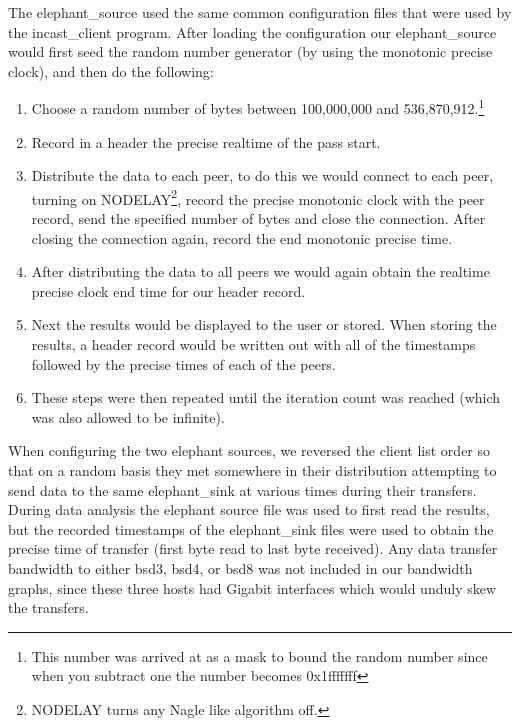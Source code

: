 \documentclass[12pt]{article}
\begin{document}
The elephant\_source used the same common configuration files that were used by the incast\_client program.
After loading the configuration our elephant\_source would first
seed the random number generator (by using the monotonic precise clock), and then
do the following:

\begin{enumerate}

\item Choose a random number of bytes between 100,000,000 and
  536,870,912.\footnote{This number was arrived at as a mask to bound the
  random number since when you subtract one the number becomes 0x1fffffff}

\item Record in a header the precise realtime of the pass start.

\item Distribute the data to each peer, to do this we would connect to each peer, turning on 
NODELAY\footnote{NODELAY turns any Nagle\cite{rfc896} like algorithm off.}, record the
precise monotonic clock with the peer record, send the specified number of bytes
and close the connection. After closing the connection again, record the end monotonic 
precise time.

\item After distributing the data to all peers we would again obtain the realtime precise
clock end time for our header record.


\item Next the results would be displayed to the user or stored. When storing the
results, a header record would be written out with all of the timestamps followed
by the precise times of each of the peers.

\item These steps were then repeated until the iteration count was reached (which was
also allowed to be infinite).

\end{enumerate}

When configuring the two elephant sources, we reversed the client list order so that on a random
basis they met somewhere in their distribution attempting to send data to the same elephant\_sink at various
times during their transfers. During data analysis the elephant source file was used to first read the results, but the 
recorded timestamps of the elephant\_sink files were used to obtain the precise time of transfer (first byte
read to last byte received). Any data transfer bandwidth to either bsd3, bsd4, or bsd8 was not included in
our bandwidth graphs, since these three hosts had Gigabit interfaces which would unduly skew the
transfers.
\end{document}
